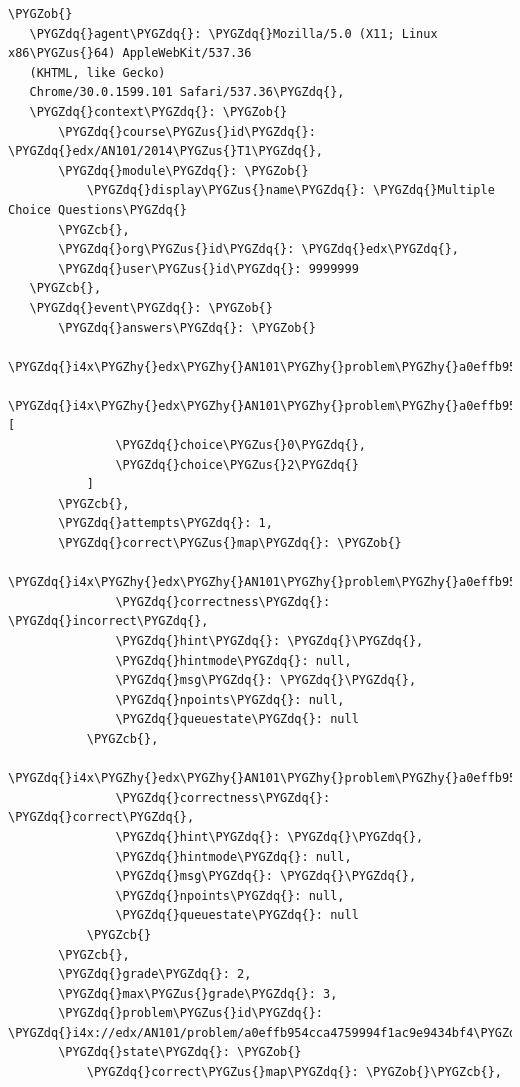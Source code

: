 \documentclass[a4paper,12pt,oneside]{sphinxmanual}
\def\PYGZus{\char`\_}
\def\PYGZob{\char`\{}
\def\PYGZcb{\char`\}}
\def\PYGZhy{\char`\-}
\def\PYGZdq{\char`\"}
\begin{document}
\begin{Verbatim}[commandchars=\\\{\}]
\PYGZob{}
   \PYGZdq{}agent\PYGZdq{}: \PYGZdq{}Mozilla/5.0 (X11; Linux x86\PYGZus{}64) AppleWebKit/537.36
   (KHTML, like Gecko)
   Chrome/30.0.1599.101 Safari/537.36\PYGZdq{},
   \PYGZdq{}context\PYGZdq{}: \PYGZob{}
       \PYGZdq{}course\PYGZus{}id\PYGZdq{}: \PYGZdq{}edx/AN101/2014\PYGZus{}T1\PYGZdq{},
       \PYGZdq{}module\PYGZdq{}: \PYGZob{}
           \PYGZdq{}display\PYGZus{}name\PYGZdq{}: \PYGZdq{}Multiple Choice Questions\PYGZdq{}
       \PYGZcb{},
       \PYGZdq{}org\PYGZus{}id\PYGZdq{}: \PYGZdq{}edx\PYGZdq{},
       \PYGZdq{}user\PYGZus{}id\PYGZdq{}: 9999999
   \PYGZcb{},
   \PYGZdq{}event\PYGZdq{}: \PYGZob{}
       \PYGZdq{}answers\PYGZdq{}: \PYGZob{}
           \PYGZdq{}i4x\PYGZhy{}edx\PYGZhy{}AN101\PYGZhy{}problem\PYGZhy{}a0effb954cca4759994f1ac9e9434bf4\PYGZus{}2\PYGZus{}1\PYGZdq{}:\PYGZdq{}yellow\PYGZdq{},
           \PYGZdq{}i4x\PYGZhy{}edx\PYGZhy{}AN101\PYGZhy{}problem\PYGZhy{}a0effb954cca4759994f1ac9e9434bf4\PYGZus{}4\PYGZus{}1\PYGZdq{}: [
               \PYGZdq{}choice\PYGZus{}0\PYGZdq{},
               \PYGZdq{}choice\PYGZus{}2\PYGZdq{}
           ]
       \PYGZcb{},
       \PYGZdq{}attempts\PYGZdq{}: 1,
       \PYGZdq{}correct\PYGZus{}map\PYGZdq{}: \PYGZob{}
           \PYGZdq{}i4x\PYGZhy{}edx\PYGZhy{}AN101\PYGZhy{}problem\PYGZhy{}a0effb954cca4759994f1ac9e9434bf4\PYGZus{}2\PYGZus{}1\PYGZdq{}:\PYGZob{}
               \PYGZdq{}correctness\PYGZdq{}: \PYGZdq{}incorrect\PYGZdq{},
               \PYGZdq{}hint\PYGZdq{}: \PYGZdq{}\PYGZdq{},
               \PYGZdq{}hintmode\PYGZdq{}: null,
               \PYGZdq{}msg\PYGZdq{}: \PYGZdq{}\PYGZdq{},
               \PYGZdq{}npoints\PYGZdq{}: null,
               \PYGZdq{}queuestate\PYGZdq{}: null
           \PYGZcb{},
           \PYGZdq{}i4x\PYGZhy{}edx\PYGZhy{}AN101\PYGZhy{}problem\PYGZhy{}a0effb954cca4759994f1ac9e9434bf4\PYGZus{}4\PYGZus{}1\PYGZdq{}:\PYGZob{}
               \PYGZdq{}correctness\PYGZdq{}: \PYGZdq{}correct\PYGZdq{},
               \PYGZdq{}hint\PYGZdq{}: \PYGZdq{}\PYGZdq{},
               \PYGZdq{}hintmode\PYGZdq{}: null,
               \PYGZdq{}msg\PYGZdq{}: \PYGZdq{}\PYGZdq{},
               \PYGZdq{}npoints\PYGZdq{}: null,
               \PYGZdq{}queuestate\PYGZdq{}: null
           \PYGZcb{}
       \PYGZcb{},
       \PYGZdq{}grade\PYGZdq{}: 2,
       \PYGZdq{}max\PYGZus{}grade\PYGZdq{}: 3,
       \PYGZdq{}problem\PYGZus{}id\PYGZdq{}: \PYGZdq{}i4x://edx/AN101/problem/a0effb954cca4759994f1ac9e9434bf4\PYGZdq{},
       \PYGZdq{}state\PYGZdq{}: \PYGZob{}
           \PYGZdq{}correct\PYGZus{}map\PYGZdq{}: \PYGZob{}\PYGZcb{},

\end{Verbatim}
\end{document}

